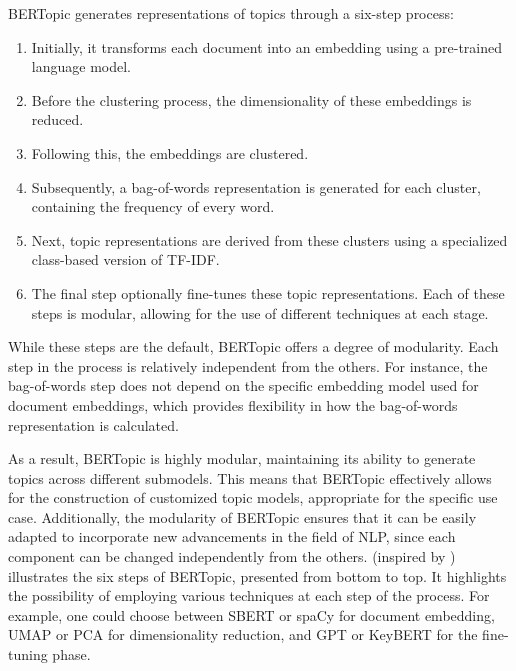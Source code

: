BERTopic generates representations of topics through a six-step process:

\begin{enumerate}
    \item Initially, it transforms each document into an embedding using a pre-trained language model.
    \item Before the clustering process, the dimensionality of these embeddings is reduced.
    \item Following this, the embeddings are clustered.
    \item Subsequently, a bag-of-words representation is generated for each cluster, containing the frequency of every word.
    \item Next, topic representations are derived from these clusters using a specialized class-based version of TF-IDF.
    \item The final step optionally fine-tunes these topic representations. Each of these steps is modular, allowing for the use of different techniques at each stage.
\end{enumerate}

While these steps are the default, BERTopic offers a degree of modularity. Each step in the process is relatively independent from the others. For instance, the bag-of-words step does not depend on the specific embedding model used for document embeddings, which provides flexibility in how the bag-of-words representation is calculated.

As a result, BERTopic is highly modular, maintaining its ability to generate topics across different submodels. This means that BERTopic effectively allows for the construction of customized topic models, appropriate for the specific use case. Additionally, the modularity of BERTopic ensures that it can be easily adapted to incorporate new advancements in the field of NLP, since each component can be changed independently from the others.  (inspired by \cite{grootendorst_algorithm_nodate}) illustrates the six steps of BERTopic, presented from bottom to top. It highlights the possibility of employing various techniques at each step of the process. For example, one could choose between SBERT or spaCy for document embedding, UMAP \cite{mcinnes_umap_2020} or PCA \cite{abdi_principal_2010} for dimensionality reduction, and GPT or KeyBERT \cite{grootendorst_maartengrkeybert_2024} for the fine-tuning phase.

